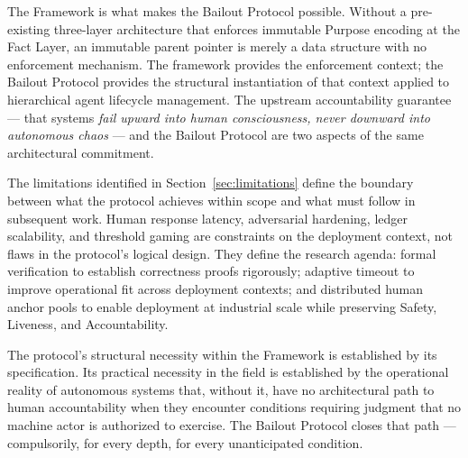 The \bxthree{} Framework is what makes the Bailout Protocol possible. Without a pre-existing three-layer architecture that enforces immutable Purpose encoding at the Fact Layer, an immutable parent pointer is merely a data structure with no enforcement mechanism. The framework provides the enforcement context; the Bailout Protocol provides the structural instantiation of that context applied to hierarchical agent lifecycle management. The upstream accountability guarantee --- that \bxthree{} systems \emph{fail upward into human consciousness, never downward into autonomous chaos} --- and the Bailout Protocol are two aspects of the same architectural commitment.

The limitations identified in Section~\ref{sec:limitations} define the boundary between what the protocol achieves within scope and what must follow in subsequent work. Human response latency, adversarial hardening, ledger scalability, and threshold gaming are constraints on the deployment context, not flaws in the protocol's logical design. They define the research agenda: formal verification to establish correctness proofs rigorously; adaptive timeout to improve operational fit across deployment contexts; and distributed human anchor pools to enable deployment at industrial scale while preserving Safety, Liveness, and Accountability.

The protocol's structural necessity within the \bxthree{} Framework is established by its specification. Its practical necessity in the field is established by the operational reality of autonomous systems that, without it, have no architectural path to human accountability when they encounter conditions requiring judgment that no machine actor is authorized to exercise. The Bailout Protocol closes that path --- compulsorily, for every depth, for every unanticipated condition.
